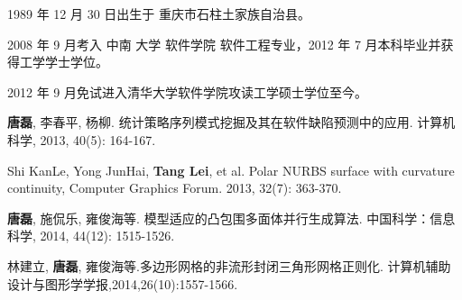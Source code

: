 \begin{resume}


  1989 年 12 月 30 日出生于 重庆市石柱土家族自治县。
  
  2008 年 9 月考入 中南 大学 软件学院 软件工程专业，2012 年 7 月本科毕业并获得工学学士学位。
  
  2012 年 9 月免试进入清华大学软件学院攻读工学硕士学位至今。


  \begin{enumerate}[{[}1{]}]
    \item \textbf{唐磊}, 李春平, 杨柳. 统计策略序列模式挖掘及其在软件缺陷预测中的应用. 计算机科学, 2013, 40(5): 164-167.
    \item Shi KanLe, Yong JunHai, \textbf{Tang Lei}, et al. Polar NURBS surface with curvature continuity, Computer Graphics Forum. 2013, 32(7): 363-370.
    \item \textbf{唐磊}, 施侃乐, 雍俊海等. 模型适应的凸包围多面体并行生成算法. 中国科学：信息科学, 2014, 44(12): 1515-1526.
    \item 林建立, \textbf{唐磊}, 雍俊海等.多边形网格的非流形封闭三角形网格正则化. 计算机辅助设计与图形学学报,2014,26(10):1557-1566.
  \end{enumerate}


\end{resume}
